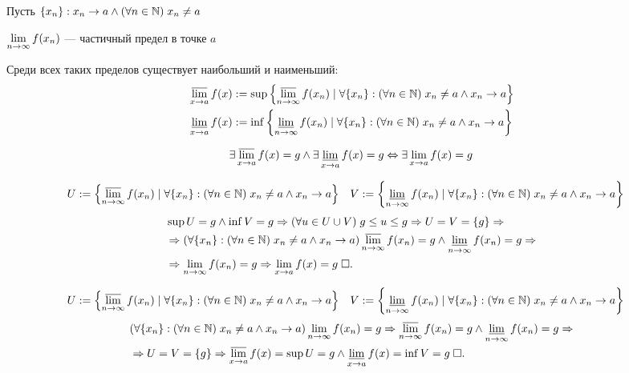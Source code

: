\documentclass{article}
\begin{document}

\newcommand{\setdeff}[2]{\left\{#1\;|\;#2\right\}}


Пусть $\{x_{n}\}: x_{n}\to a\land(\forall n\in\mathbb{N})\;x_{n}\neq a$

$\lim\limits_{n\to\infty} f(x_{n})$ --- частичный предел в точке $a$

Среди всех таких пределов существует наибольший и наименьший:
\begin{align*}
	 & \slimsup{x\to a}f(x):=\sup\setdeff{\slimsup{n\to\infty}f(x_{n})}{\forall\{x_{n}\}:(\forall n\in\N)\;x_{n}\neq a\land x_{n}\to a} \\
	 & \sliminf{x\to a}f(x):=\inf\setdeff{\sliminf{n\to\infty}f(x_{n})}{\forall\{x_{n}\}:(\forall n\in\N)\;x_{n}\neq a\land x_{n}\to a}
\end{align*}

\theorem
\begin{align*}
	\exists\varlimsup\limits_{x\to a}f(x)=g\land\exists\varliminf\limits_{x\to a}f(x)=g\Leftrightarrow\exists\lim\limits_{x\to a}f(x)=g
\end{align*}

\onlyif
\begin{align*}
	 & U:=\setdeff{\slimsup{n\to\infty}f(x_{n})}{\forall\{x_{n}\}:(\forall n\in\N)\;x_{n}\neq a\land x_{n}\to a} &
	 & V:=\setdeff{\sliminf{n\to\infty}f(x_{n})}{\forall\{x_{n}\}:(\forall n\in\N)\;x_{n}\neq a\land x_{n}\to a}
\end{align*}
\begin{align*}
	 & \sup U =g\land\inf V=g\Rightarrow (\forall u\in U\cup V)\;g\leq u\leq g\Rightarrow U=V=\{g\}\Rightarrow                                                        \\
	 & \Rightarrow (\forall\{x_{n}\}:(\forall n\in\mathbb{N})\;x_{n}\neq a\land x_{n}\to a)\varlimsup\limits_{n\to\infty}f(x_{n})=g\land\varliminf\limits_{n\to\infty}f(x_{n})=g\Rightarrow \\
	 & \Rightarrow\lim\limits_{n\to\infty} f(x_{n})=g\Rightarrow\lim\limits_{x\to a}f(x)=g\;\square.
\end{align*}

\enough
\begin{align*}
	 & U:=\setdeff{\slimsup{n\to\infty}f(x_{n})}{\forall\{x_{n}\}:(\forall n\in\N)\;x_{n}\neq a\land x_{n}\to a} &
	 & V:=\setdeff{\sliminf{n\to\infty}f(x_{n})}{\forall\{x_{n}\}:(\forall n\in\N)\;x_{n}\neq a\land x_{n}\to a}
\end{align*}
\begin{align*}
	 & (\forall\{x_{n}\}:(\forall n\in\mathbb{N})\;x_{n}\neq a\land x_{n}\to a)\lim\limits_{n\to\infty} f(x_{n})=g\Rightarrow \varlimsup\limits_{n\to\infty}f(x_{n})=g\land\varliminf\limits_{n\to\infty}f(x_{n})=g\Rightarrow \\
	 & \Rightarrow U=V=\{g\}\Rightarrow\varlimsup\limits_{x\to a}f(x)=\sup U=g\land\varliminf\limits_{x\to a}f(x)=\inf V=g\;\square.
\end{align*}
\end{document}

